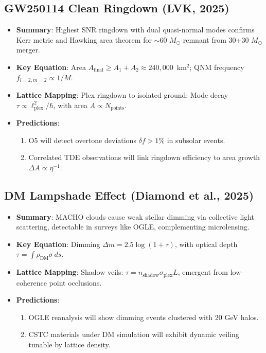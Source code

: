 \documentclass[11pt,a4paper]{article}
\begin{document}
\subsection{GW250114 Clean Ringdown (LVK, 2025)}

\begin{itemize}
\item \textbf{Summary}: Highest SNR ringdown with dual quasi-normal modes confirms Kerr metric and Hawking area theorem for $\sim$60 $M_\odot$ remnant from 30+30 $M_\odot$ merger.

\item \textbf{Key Equation}: Area $A_{\mathrm{final}} \geq A_1 + A_2 \approx 240{,}000$~km$^2$; QNM frequency $f_{l=2,m=2} \propto 1/M$.

\item \textbf{Lattice Mapping}: Plex ringdown to isolated ground: Mode decay $\tau \propto \ell_{\mathrm{plex}}^2 / \hbar$, with area $A \propto N_{\mathrm{points}}$.

\item \textbf{Predictions}:
\begin{enumerate}
\item O5 will detect overtone deviations $\delta f >1\%$ in subsolar events.
\item Correlated TDE observations will link ringdown efficiency to area growth $\Delta A \propto \eta^{-1}$.
\end{enumerate}
\end{itemize}

\subsection{DM Lampshade Effect (Diamond et al., 2025)}

\begin{itemize}
\item \textbf{Summary}: MACHO clouds cause weak stellar dimming via collective light scattering, detectable in surveys like OGLE, complementing microlensing.

\item \textbf{Key Equation}: Dimming $\Delta m = 2.5 \log(1 + \tau)$, with optical depth $\tau = \int \rho_{\mathrm{DM}} \sigma \, ds$.

\item \textbf{Lattice Mapping}: Shadow veils: $\tau = n_{\mathrm{shadow}} \sigma_{\mathrm{plex}} L$, emergent from low-coherence point occlusions.

\item \textbf{Predictions}:
\begin{enumerate}
\item OGLE reanalysis will show dimming events clustered with 20 GeV halos.
\item CSTC materials under DM simulation will exhibit dynamic veiling tunable by lattice density.
\end{enumerate}
\end{itemize}
\end{document}
